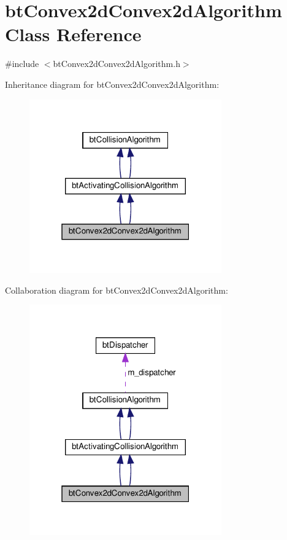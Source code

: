 \hypertarget{classbtConvex2dConvex2dAlgorithm}{}\section{bt\+Convex2d\+Convex2d\+Algorithm Class Reference}
\label{classbtConvex2dConvex2dAlgorithm}


{\ttfamily \#include $<$bt\+Convex2d\+Convex2d\+Algorithm.\+h$>$}



Inheritance diagram for bt\+Convex2d\+Convex2d\+Algorithm\+:
\nopagebreak
\begin{figure}[H]
\begin{center}
\leavevmode
\includegraphics[width=235pt]{classbtConvex2dConvex2dAlgorithm__inherit__graph}
\end{center}
\end{figure}


Collaboration diagram for bt\+Convex2d\+Convex2d\+Algorithm\+:
\nopagebreak
\begin{figure}[H]
\begin{center}
\leavevmode
\includegraphics[width=235pt]{classbtConvex2dConvex2dAlgorithm__coll__graph}
\end{center}
\end{figure}

